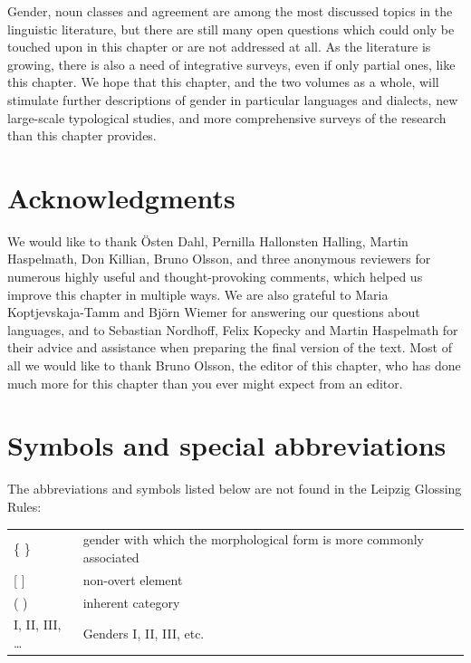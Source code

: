 \documentclass[output=collectionpaper]{langsci/langscibook}
\begin{document}
Gender, noun classes and agreement are among the most discussed topics in the linguistic literature, but there are still many open questions which could only be touched upon in this chapter or are not addressed at all. As the literature is growing, there is also a need of integrative surveys, even if only partial ones, like this chapter. We hope that this chapter, and the two volumes as a whole, will stimulate further descriptions of gender in particular languages and dialects, new large-scale typological studies, and more comprehensive surveys of the research than this chapter provides.

\section*{Acknowledgments}
We would like to thank Östen Dahl, Pernilla Hallonsten Halling, Martin Haspelmath, Don Killian, Bruno Olsson, and three anonymous reviewers for numerous highly useful and thought-provoking comments, which helped us improve this chapter in multiple ways. We are also grateful to Maria Koptjevskaja-Tamm and Björn Wiemer for answering our questions about  languages, and to Sebastian Nordhoff, Felix Kopecky and Martin Haspelmath for their advice and assistance when preparing the final version of the text. Most of all we would like to thank Bruno Olsson, the editor of this chapter, who has done much more for this chapter than you ever might expect from an editor.

\section*{Symbols and special abbreviations}

\noindent The abbreviations and symbols listed below are not found in the Leipzig Glossing Rules:
\medskip

\begin{tabularx}{\textwidth}{lX}
  \{ \}	&	gender with which the morphological form is more commonly associated	\\
{[} {]}	&	non-overt element	\\
( )	&	inherent category	\\
I, II, III, \ldots	&	Genders I, II, III, etc.\\
\end{tabularx}
\end{document}
